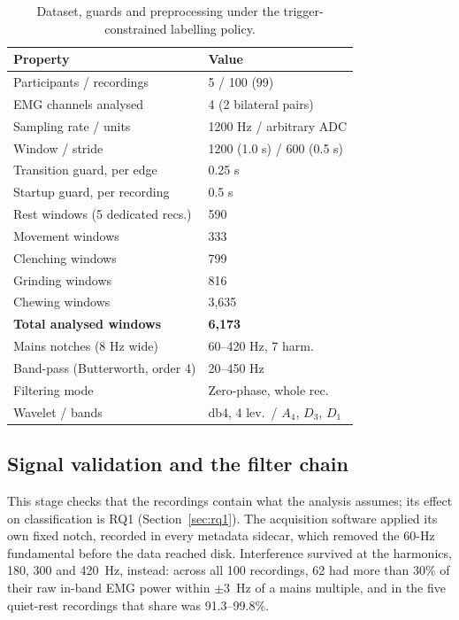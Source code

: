 \documentclass[pdflatex,sn-nature,iicol]{sn-jnl}
\begin{document}
\begin{table}[t]
  \caption{Dataset, guards and preprocessing under the trigger-constrained labelling policy.}
  \label{tab:dataset}
  \centering
  \footnotesize
  \begin{tabular*}{\columnwidth}{@{\extracolsep{\fill}}ll@{}}
    \toprule
    Property & Value \\
    \midrule
    Participants / recordings & 5 / 100 (99) \\
    EMG channels analysed & 4 (2 bilateral pairs) \\
    Sampling rate / units & 1200 Hz / arbitrary ADC \\
    Window / stride & 1200 (1.0 s) / 600 (0.5 s) \\
    Transition guard, per edge & 0.25 s \\
    Startup guard, per recording & 0.5 s \\
    \midrule
    Rest windows (5 dedicated recs.) & 590 \\
    Movement windows & 333 \\
    Clenching windows & 799 \\
    Grinding windows & 816 \\
    Chewing windows & 3,635 \\
    \textbf{Total analysed windows} & \textbf{6{,}173} \\
    \midrule
    Mains notches (8 Hz wide) & 60--420 Hz, 7 harm. \\
    Band-pass (Butterworth, order 4) & 20--450 Hz \\
    Filtering mode & Zero-phase, whole rec. \\
    Wavelet / bands & db4, 4 lev.\ / $A_4$, $D_3$, $D_1$ \\
    \bottomrule
  \end{tabular*}
\end{table}

\subsection{Signal validation and the filter chain}
\label{sec:filter}

This stage checks that the recordings contain what the analysis assumes; its effect on classification is RQ1 (Section~\ref{sec:rq1}). The acquisition software applied its own fixed notch, recorded in every metadata sidecar, which removed the 60-Hz fundamental before the data reached disk. Interference survived at the harmonics, 180, 300 and 420~Hz, instead: across all 100 recordings, 62 had more than 30\% of their raw in-band EMG power within $\pm 3$~Hz of a mains multiple, and in the five quiet-rest recordings that share was 91.3--99.8\%.
\end{document}
